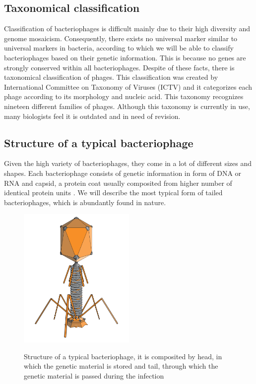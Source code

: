 
\subsection{Taxonomical classification}
Classification of bacteriophages is difficult mainly due to their high diversity and genome mosaicism. \cite{phagetax}
Consequently, there exists no universal marker similar to universal markers in bacteria, according to which we will be able to classify bacteriophages based on their genetic information.
This is because no genes are strongly conserved within all bacteriophages.
Despite of these facts, there is taxonomical classification of phages.
This classification was created by International Committee on Taxonomy of Viruses (ICTV) and it categorizes each phage according to its morphology and nucleic acid.
This taxonomy recognizes nineteen different families of phages.
Although this taxonomy is currently in use, many biologists feel it is outdated and in need of revision. \cite{phagetax}

\subsection{Structure of a typical bacteriophage}
Given the high variety of bacteriophages, they come in a lot of different sizes and shapes.
Each bacteriophage consists of genetic information in form of DNA or RNA and capsid, a protein coat usually composited from higher number of identical protein units \cite{}.
We will describe the most typical form of tailed bacteriophages, which is abundantly found in nature.

\begin{figure}[h]
\includegraphics[width=0.5\textwidth]{./images/phage.png}
\centering
\cite{phage_pic}
\caption{Structure of a typical bacteriophage, it is composited by head, in which the genetic material is stored and tail, through which the genetic material is passed during the infection 
}
\label{fig:phage}
\end{figure}


